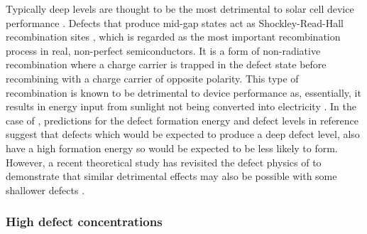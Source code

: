 \documentclass[11pt, twoside]{report}
\begin{document}
Typically deep levels are thought to be the most detrimental to solar cell device performance \cite{Stoneham_killer_defects}. 
Defects that produce mid-gap states act as Shockley-Read-Hall recombination sites \cite{SRH}, which is regarded as the most important recombination process in real, non-perfect semiconductors. It is a form of non-radiative recombination where a charge carrier is trapped in the defect state before recombining with a charge carrier of opposite polarity. This type of recombination is known to be detrimental to device performance as, essentially, it results in energy input from sunlight not being converted into electricity \cite{Nelson4}.
In the case of {\CZTS}, predictions for the defect formation energy and defect levels in reference  suggest that defects which would be expected to produce a deep defect level, also have a high formation energy so would be expected to be less likely to form.
However, a recent theoretical study has revisited the defect physics of {\CZTS} to demonstrate that similar detrimental effects may also be possible with some shallower defects \cite{Sunghyun_killer_defects}.

\subsubsection{High defect concentrations}
\end{document}
